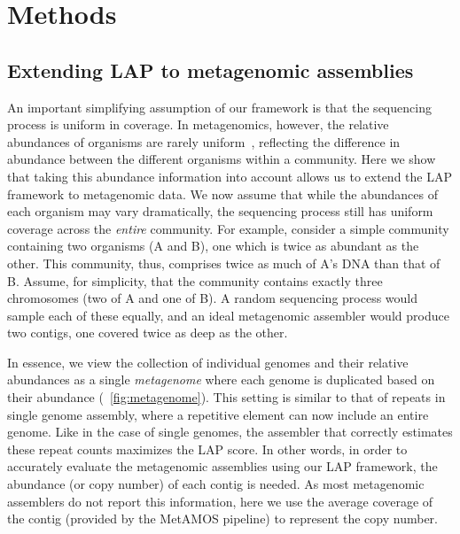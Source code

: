 \documentclass[12pt,\mydriver]{thesis}
\begin{document}
\section{Methods}


\subsection{Extending LAP to metagenomic assemblies}

An important simplifying assumption of our framework is that the sequencing process is uniform in coverage.
In metagenomics, however, the relative abundances of organisms are rarely uniform~\cite{carrigg2007dna,krsek1999comparison,morgan2010metagenomic,temperton2009bias}, reflecting the difference in abundance between the different organisms within a community.
Here we show that taking this abundance information into account allows us to extend the LAP framework to metagenomic data.
We now assume that while the abundances of each organism may vary dramatically, the sequencing process still has uniform coverage across the \emph{entire} community.
For example, consider a simple community containing two organisms (A and B), one which is twice as abundant as the other.
This community, thus, comprises twice as much of A's DNA than that of B.
Assume, for simplicity, that the community contains exactly three chromosomes (two of A and one of B).
A random sequencing process would sample each of these equally, and an ideal metagenomic assembler would produce two contigs, one covered twice as deep as the other.



In essence, we view the collection of individual genomes and their relative abundances as a single \emph{metagenome} where each genome is duplicated based on their abundance (\figurename~\ref{fig:metagenome}).
This setting is similar to that of repeats in single genome assembly, where a repetitive element can now include an entire genome.
Like in the case of single genomes, the assembler that correctly estimates these repeat counts maximizes the LAP score.
In other words, in order to accurately evaluate the metagenomic assemblies using our LAP framework, the abundance (or copy number) of each contig is needed.
As most metagenomic assemblers do not report this information,
here we use the average coverage of the contig (provided by the MetAMOS pipeline) to represent the copy number.
\end{document}
